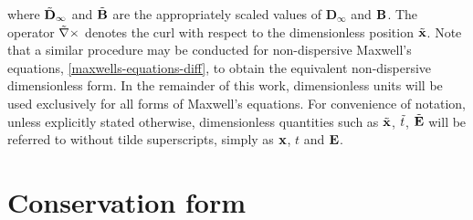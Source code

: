 where $\tilde{\mathbf{D}}_{\infty}$ and $\tilde{\mathbf{B}}$ are the appropriately scaled values of $\mathbf{D}_{\infty}$ and $\mathbf{B}$. The operator $\tilde{\nabla} \times$ denotes the curl with respect to the dimensionless position $\tilde{\mathbf{x}}$. Note that a similar procedure may be conducted for non-dispersive Maxwell's equations, \eqref{maxwells-equations-diff}, to obtain the equivalent non-dispersive dimensionless form.
In the remainder of this work, dimensionless units will be used exclusively for all forms of Maxwell's equations. For convenience of notation, unless explicitly stated otherwise, dimensionless quantities such as $\tilde{\mathbf{x}}$, $\tilde{t}$, $\tilde{\mathbf{E}}$ will be referred to without tilde superscripts, simply as $\mathbf{x}$, $t$ and $\mathbf{E}$.

\section{Conservation form}

